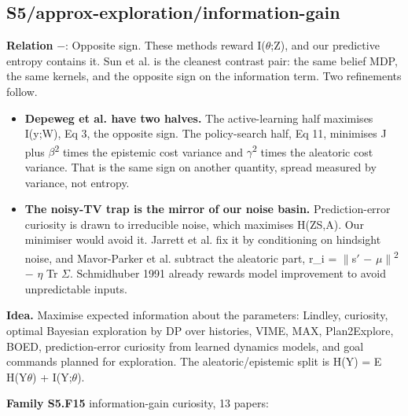 \documentclass[10pt]{article}
\newcommand{\memb}[1]{\par\smallskip\textbf{#1}\quad}
\begin{document}
\subsection{S5/approx-exploration/information-gain}\label{node:S5-S5-approx-exploration-information-gain}
\textbf{Relation} $-$: Opposite sign. These methods reward I(\ensuremath{\theta};Z), and our predictive entropy contains it. Sun et al. is the cleanest contrast pair: the same belief MDP, the same kernels, and the opposite sign on the information term. Two refinements follow.
\begin{itemize}[nosep,leftmargin=1.2em]
\item \textbf{Depeweg et al. have two halves.} The active-learning half maximises I(y;W), Eq 3, the opposite sign. The policy-search half, Eq 11, minimises J plus \ensuremath{\beta}\textsuperscript{2} times the epistemic cost variance and \ensuremath{\gamma}\textsuperscript{2} times the aleatoric cost variance. That is the same sign on another quantity, spread measured by variance, not entropy.
\item \textbf{The noisy-TV trap is the mirror of our noise basin.} Prediction-error curiosity is drawn to irreducible noise, which maximises H(Z\textbar{}S,A). Our minimiser would avoid it. Jarrett et al. fix it by conditioning on hindsight noise, and Mavor-Parker et al. subtract the aleatoric part, r\_i = \ensuremath{\|}s\ensuremath{'} \ensuremath{-} \ensuremath{\mu}\ensuremath{\|}\textsuperscript{2} \ensuremath{-} \ensuremath{\eta} Tr \ensuremath{\Sigma}. Schmidhuber 1991 already rewards model improvement to avoid unpredictable inputs.
\end{itemize}


\textbf{Idea.} Maximise expected information about the parameters: Lindley, curiosity, optimal Bayesian exploration by DP over histories, VIME, MAX, Plan2Explore, BOED, prediction-error curiosity from learned dynamics models, and goal commands planned for exploration. The aleatoric/epistemic split is H(Y) = E H(Y\textbar{}\ensuremath{\theta}) + I(Y;\ensuremath{\theta}).

\memb{Family S5.F15} information-gain curiosity, 13 papers: {\footnotesize \citetext{\citealp{Schmidhuber-curious91}; \citealp{Sun-planning11}; \citealp{Houthooft-vime16}; \citealp{Jarrett-curiosity22}; \citealp{Storck-reinforcement95}\dag; \citealp{Little-learning11}; \citealp{Achiam-surprisebased17}; \citealp{Shyam-model18}; \citealp{Pathak-self19}; \citealp{Bai-variational20}; \citealp{Sekar-planning20}; \citealp{Oren-epistemic22}; \citealp{Hu-planning23}}}
\end{document}
